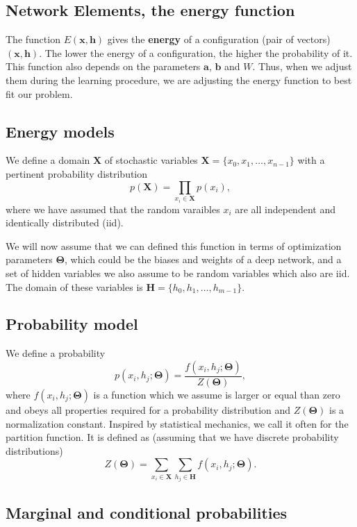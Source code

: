 \documentclass[%
oneside,                 %
final,                   %
10pt]{article}
\begin{document}
\subsection{Network Elements, the energy function}

The function $E(\bm{x},\bm{h})$ gives the \textbf{energy} of a
configuration (pair of vectors) $(\bm{x}, \bm{h})$. The lower
the energy of a configuration, the higher the probability of it. This
function also depends on the parameters $\bm{a}$, $\bm{b}$ and
$W$. Thus, when we adjust them during the learning procedure, we are
adjusting the energy function to best fit our problem.

\subsection{Energy models}

We define a domain $\bm{X}$ of stochastic variables $\bm{X}= \{x_0,x_1, \dots , x_{n-1}\}$ with a pertinent probability distribution
\[
p(\bm{X})=\prod_{x_i\in \bm{X}}p(x_i),
\]
where we have assumed that the random varaibles $x_i$ are all independent and identically distributed (iid).

We will now assume that we can defined this function in terms of optimization parameters $\bm{\Theta}$, which could be the biases and weights of a deep network, and a set of hidden variables we also assume to be random variables which also are iid. The domain of these variables is
$\bm{H}= \{h_0,h_1, \dots , h_{m-1}\}$.

\subsection{Probability model}

We define a probability
\[
p(x_i,h_j;\bm{\Theta}) = \frac{f(x_i,h_j;\bm{\Theta})}{Z(\bm{\Theta})},
\]
where $f(x_i,h_j;\bm{\Theta})$ is a function which we assume is larger or
equal than zero and obeys all properties required for a probability
distribution and $Z(\bm{\Theta})$ is a normalization constant. Inspired by
statistical mechanics, we call it often for the partition function.
It is defined as (assuming that we have discrete probability distributions)
\[
Z(\bm{\Theta})=\sum_{x_i\in \bm{X}}\sum_{h_j\in \bm{H}} f(x_i,h_j;\bm{\Theta}).
\]

\subsection{Marginal and conditional probabilities}
\end{document}
